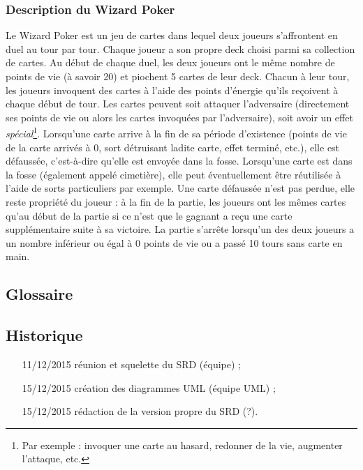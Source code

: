 \documentclass{article}
\begin{document}
        \subsubsection{Description du Wizard Poker}
            Le Wizard Poker est un jeu de cartes dans lequel deux joueurs s'affrontent en \gls{duel} au tour par tour. Chaque joueur a son propre \gls{deck}
            choisi parmi sa collection de cartes. Au début de chaque duel, les deux joueurs ont le même nombre de points de vie (à savoir 20) et piochent 5
            cartes de leur \gls{deck}. Chacun à leur tour, les joueurs invoquent des cartes à l'aide des points d'énergie qu'ils reçoivent à chaque début de tour.
            Les cartes peuvent soit attaquer l'adversaire (directement ses points de vie ou alors les cartes invoquées par l'adversaire), soit avoir
            un effet \textit{spécial}\footnote{Par exemple : invoquer une carte au hasard, redonner de la vie, augmenter l'attaque, etc.}. Lorsqu'une carte
            arrive à la fin de sa période d'existence (points de vie de la carte arrivés à 0, sort détruisant ladite carte, effet terminé, etc.), elle est
            défaussée, c'est-à-dire qu'elle est envoyée dans la \gls{fosse}. Lorsqu'une carte est dans la fosse (également appelé cimetière), elle
            peut éventuellement être réutilisée à l'aide de sorts particuliers par exemple. Une carte défaussée n'est pas perdue, elle reste propriété du joueur :
            à la fin de la partie, les joueurs ont les mêmes cartes qu'au début de la partie si ce n'est que le gagnant a reçu une carte supplémentaire
            suite à sa victoire. La partie s'arrête lorsqu'un des deux joueurs a un nombre inférieur ou égal à 0 points de vie ou a passé 10 tours sans carte en main.

    \subsection{Glossaire}  %
        \printglossary[type=glossary, style=noIndex, title=]

    \subsection{Historique}
        \begin{itemize}
            \item[11/12/2015] réunion et squelette du SRD (équipe) ;
            \item[15/12/2015] création des diagrammes UML (équipe UML) ;  %
            \item[15/12/2015] rédaction de la version propre du SRD (?).
        \end{itemize}
\end{document}
